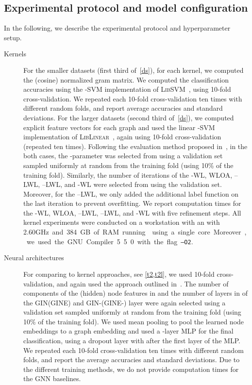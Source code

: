 \documentclass{article}
\theoremstyle{definition}
\newcommand{\CC}[1][]{}
\newcommand{\wl}{-\textsf{WL}\xspace}
\newcommand{\kwl}{-\textsf{WL}\xspace}
\newcommand{\localkwl}{--\textsf{LWL}\xspace}
\newcommand{\pluskwl}{--\textsf{LWL}\xspace}
\newcommand{\wloa}{\textsf{WLOA}\xspace}
\newcommand{\gin}{\textsf{GIN}\xspace}
\newcommand{\gine}{\textsf{GINE}\xspace}
\newcommand{\gineps}{\textsf{GIN-}\xspace}
\newcommand{\gineeps}{\textsf{GINE-}\xspace}
\begin{document}
\subsection{Experimental protocol and model configuration}\label{protocol}

In the following, we describe the experimental protocol and hyperparameter setup.
\begin{description}
	\item[Kernels] For the smaller datasets (first third of~\cref{ds}), for each kernel, we computed the (cosine) normalized gram matrix. We computed the classification accuracies using the -SVM implementation of \textsc{LibSVM}~\cite{Cha+11}, using 10-fold cross-validation. 
	We repeated each 10-fold cross-validation ten times with different random folds, and report average accuracies and standard deviations. For the larger datasets (second third of~\cref{ds}), we computed explicit feature vectors for each graph and used the linear -SVM implementation of \textsc{LibLinear}~\cite{Fan+2008}, again using 10-fold cross-validation (repeated ten times). 
	Following the evaluation method proposed in~\cite{Mor+2020}, in the both cases, the -parameter was selected from   using a validation set sampled uniformly at random from the training fold (using 10\% of the training fold). Similarly, the number of iterations of the \wl, \wloa, \localkwl, \pluskwl, and \kwl were selected from  using the validation set. Moreover, for the \pluskwl, we only added the additional label function  on the last iteration to prevent overfitting.
	We report computation times for the \wl, \wloa, \localkwl, \pluskwl, and \kwl with five refinement steps. All kernel experiments were conducted on a workstation with an  with 2.60\si GHz and 384\si GB of RAM running  using a single core. Moreover, we used the GNU \CC Compiler 5.5.0 with the flag \texttt{--O2}. 
	\item[Neural architectures] For comparing to kernel approaches, see \cref{t2,t2l}, we used 10-fold cross-validation, and again used the approach outlined in~\cite{Mor+2020}. The number of components of the (hidden) node features in  and the number of layers in  of the \gin (\gine) and \gineps (\gineeps) layer were again selected using a validation set sampled uniformly at random from the training fold (using 10\% of the training fold). We used mean pooling to pool the learned node embeddings to a graph embedding and used a -layer MLP for the final classification, using a dropout layer with  after the first layer
	of the MLP. We repeated each 10-fold cross-validation ten times with different random folds, and report the average accuracies and standard deviations. Due to the different training methods, we do not provide computation times for the GNN baselines. 
	

\end{description}
\end{document}
